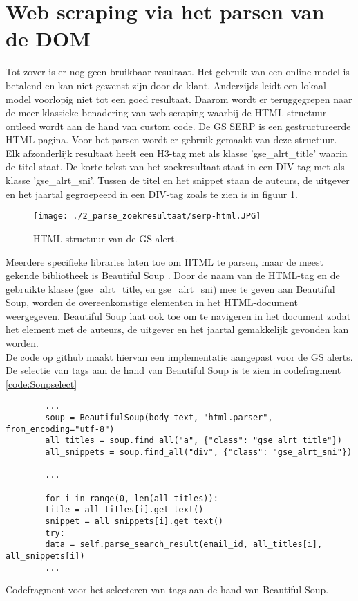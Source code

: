 \section{Web scraping via het parsen van de DOM}
Tot zover is er nog geen bruikbaar resultaat. Het gebruik van een online model is betalend en kan niet gewenst zijn door de klant. Anderzijds leidt een lokaal model voorlopig niet tot een goed resultaat. Daarom wordt er teruggegrepen naar de meer klassieke benadering van web scraping waarbij de HTML structuur ontleed wordt aan de hand van custom code.
De GS SERP is een gestructureerde HTML pagina. Voor het parsen wordt er gebruik gemaakt van deze structuur.
Elk afzonderlijk resultaat heeft een H3-tag met als klasse 'gse\_alrt\_title' waarin de titel staat. De korte tekst van het zoekresultaat staat in een DIV-tag met als klasse 'gse\_alrt\_sni'. Tussen de titel en het snippet staan de auteurs, de uitgever en het jaartal gegroepeerd in een DIV-tag zoals te zien is in figuur \ref{fig:serp_html}.
\begin{figure}
    \centering
    \texttt{[image: ./2\_parse\_zoekresultaat/serp-html.JPG]}
    \caption[HTML structuur van de GS alert.]{\label{fig:serp_html}HTML structuur van de GS alert.}
\end{figure}
\FloatBarrier
Meerdere specifieke libraries laten toe om HTML te parsen, maar de meest gekende bibliotheek is Beautiful Soup \autocite{Soup2025}. Door de naam van de HTML-tag en de gebruikte klasse (gse\_alrt\_title, en gse\_alrt\_sni) mee te geven aan Beautiful Soup, worden de overeenkomstige elementen in het HTML-document weergegeven. Beautiful Soup laat ook toe om te navigeren in het document zodat het element met de auteurs, de uitgever en het jaartal gemakkelijk gevonden kan worden.\\
De code op github \textcite{DepaepeBeautifulsoup2025} maakt hiervan een implementatie aangepast voor de GS alerts. 
De selectie van tags aan de hand van Beautiful Soup is te zien in codefragment \ref{code:Soupselect}
\begin{listing}
    \begin{verbatim}
        ...
        soup = BeautifulSoup(body_text, "html.parser", from_encoding="utf-8")
        all_titles = soup.find_all("a", {"class": "gse_alrt_title"})
        all_snippets = soup.find_all("div", {"class": "gse_alrt_sni"})
        
        ...
        
        for i in range(0, len(all_titles)):
        title = all_titles[i].get_text()
        snippet = all_snippets[i].get_text()
        try:
        data = self.parse_search_result(email_id, all_titles[i], all_snippets[i])
        ...
    \end{verbatim}
    \caption[Beautiful Soup select codefragment]{Codefragment voor het selecteren van tags aan de hand van Beautiful Soup.}
    \label{code:Soupselect}
\end{listing}
